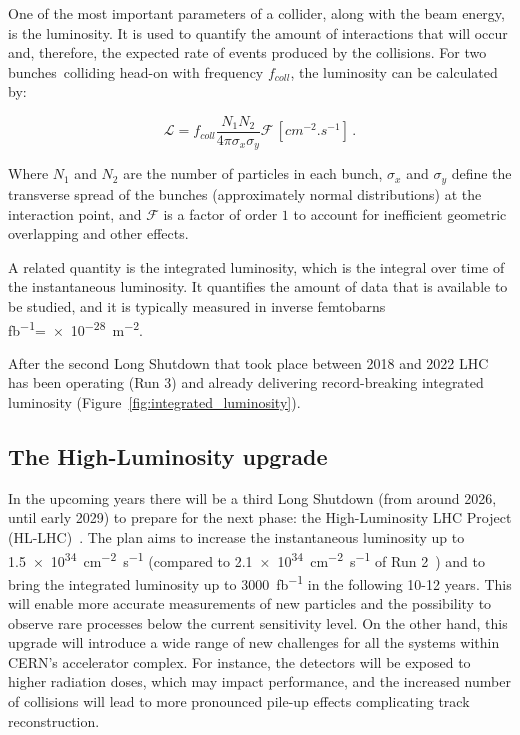 One of the most important parameters of a collider, along with the beam energy, is the luminosity. It is used to quantify the amount of interactions that will occur and, therefore, the expected rate of events produced by the collisions. For two bunches\footnotemark ~colliding head-on with frequency \(f_{coll}\), the luminosity can be calculated by:

\begin{equation}
    \mathcal{L} = f_{coll}\frac{N_1 N_2}{4\pi \sigma_x \sigma_y} \mathcal{F} \, \left[\unit{cm^{-2}.s^{-1}}\right] \, .
\end{equation}

Where \(N_1\) and \(N_2\) are the number of particles in each bunch, \(\sigma_x\) and \(\sigma_y\) define the transverse spread of the bunches (approximately normal distributions) at the interaction point, and \(\mathcal{F}\) is a factor of order \(1\) to account for inefficient geometric overlapping and other effects.

A related quantity is the integrated luminosity, which is the integral over time of the instantaneous luminosity. It quantifies the amount of data that is available to be studied, and it is typically measured in inverse femtobarns \unit{\femto\barn^{-1}}=\qty{e-28}{\meter^{-2}}.

After the second Long Shutdown that took place between 2018 and 2022 LHC has been operating (Run 3) and already delivering record-breaking integrated luminosity (Figure~\ref{fig:integrated_luminosity}).

\subsection{The High-Luminosity upgrade}\label{subsec:high_luminosity_upgrade}
In the upcoming years there will be a third Long Shutdown (from around 2026, until early 2029) to prepare for the next phase: the High-Luminosity LHC Project (HL-LHC)~\cite{cernHLLHCProject}. The plan aims to increase the instantaneous luminosity up to \qty{1.5e34}{\centi\meter^{-2}\second^{-1}} (compared to \qty{2.1e34}{\centi\meter^{-2}\second^{-1}} of Run 2~\cite{CERN-LHCC-2020-007}) and to bring the integrated luminosity up to \qty{3000}{\femto\barn^{-1}} in the following 10-12 years. This will enable more accurate measurements of new particles and the possibility to observe rare processes below the current sensitivity level. On the other hand, this upgrade will introduce a wide range of new challenges for all the systems within CERN's accelerator complex. For instance, the detectors will be exposed to higher radiation doses, which may impact performance, and the increased number of collisions will lead to more pronounced pile-up effects complicating track reconstruction.

